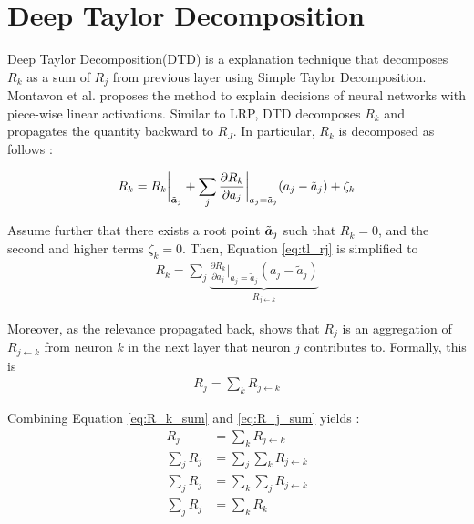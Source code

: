 

\section{Deep Taylor Decomposition}
Deep Taylor Decomposition(DTD) is a explanation technique that decomposes $R_k$ as a sum of $R_j$ from previous layer using Simple Taylor Decomposition. Montavon et al.\cite{MontavonExplainingnonlinearclassification2017} proposes the method to explain decisions of neural networks with piece-wise linear activations. Similar to LRP, DTD decomposes $R_k$ and propagates the quantity backward to $R_J$. In particular, $R_k$ is decomposed as follows :




 \begin{align} \label{eq:tl_rj}
 R_k = R_k \bigg|_{ \tilde{\patvector{a}}_j } + \sum_{ j } 	\frac{\partial  R_k }{ \partial a_j } \bigg|_{ a_j = \tilde{a}_j } ( a_j - \tilde{a}_j ) + \zeta_k
 \end{align}

Assume further that there exists a root point $\tilde{\patvector{a}}_j$ such that $R_k = 0$, and the second and higher terms $\zeta_k = 0 $. Then, Equation \ref{eq:tl_rj} is simplified to
\begin{align} \label{eq:R_k_sum}
 R_k = \sum_{ j } \underbrace{	\frac{\partial  R_k }{ \partial a_j } \bigg|_{ a_j = \tilde{a}_j }  ( a_j - \tilde{a}_j ) }_{ R_{j \leftarrow k } }
\end{align}

Moreover, as the relevance propagated back, \cite{MontavonExplainingnonlinearclassification2017} shows that $R_j$ is an aggregation of $R_{j\leftarrow k}$ from neuron $k$ in the next layer that neuron $j$ contributes to. Formally, this is
\begin{align} \label{eq:R_j_sum}
	R_j = \sum_{k} R_{j\leftarrow k}
\end{align}

Combining Equation \ref{eq:R_k_sum} and \ref{eq:R_j_sum} yields :
\begin{align} \label{eq:rj_equal_rk}
	R_j &= \sum_{k} R_{j\leftarrow k} \nonumber \\
\sum_{j}	R_j &= \sum_{j} \sum_{k} R_{j\leftarrow k}\nonumber\\
\sum_{j}	R_j &= \sum_{k} \sum_{j} R_{j\leftarrow k} \nonumber\\
\sum_{j}	R_j &= \sum_{k}  R_{k}
\end{align}

